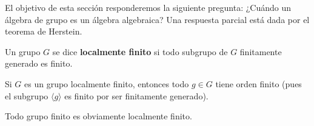 %
%
%



El objetivo de esta sección responderemos la siguiente pregunta: ¿Cuándo un
álgebra de grupo es un álgebra algebraica? Una respuesta parcial está dada por
el teorema de Herstein. 

\begin{definition}
	Un grupo $G$ se dice \textbf{localmente finito} si todo subgrupo de $G$
	finitamente generado es finito.
\end{definition}

Si $G$ es un grupo localmente finito, entonces todo $g\in G$ tiene orden finito
(pues el subgrupo $\langle g\rangle$ es finito por ser finitamente generado). 

\begin{example}
	Todo grupo finito es obviamente localmente finito.
\end{example}

